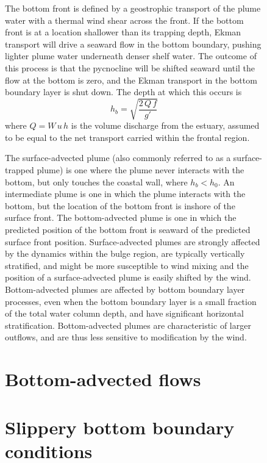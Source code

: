 \documentclass[11pt]{report}
\numberwithin{equation}{section}
\begin{document}
\begin{figure}
The bottom front is defined by a geostrophic transport of the plume water with a thermal wind shear across the front.  If the bottom front is at a location shallower than its trapping depth, Ekman transport will drive a seaward flow in the bottom boundary, pushing lighter plume water underneath denser shelf water.  The outcome of this process is that the pycnocline will be shifted seaward until the flow at the bottom is zero, and the Ekman transport in the bottom boundary layer is shut down.  The depth at which this occurs is
\begin{equation}
    h_b = \sqrt{ \frac{2\,Q\,f}{g'} }
\end{equation}
where $Q=W\,u\,h$ is the volume discharge from the estuary, assumed to be equal to the net transport carried within the frontal region.

The surface-advected plume (also commonly referred to as a surface-trapped plume) is one where the plume never interacts with the bottom, but only touches the coastal wall, where $h_b < h_0$.  An intermediate plume is one in which the plume interacts with the bottom, but the location of the bottom front is inshore of the surface front.  The bottom-advected plume is one in which the predicted position of the bottom front is seaward of the predicted surface front position.  Surface-advected plumes are strongly affected by the dynamics within the bulge region, are typically vertically stratified, and might be more susceptible to wind mixing and the position of a surface-advected plume is easily shifted by the wind.  Bottom-advected plumes are affected by bottom boundary layer processes, even when the bottom boundary layer is a small fraction of the total water column depth, and have significant horizontal stratification.  Bottom-advected plumes are characteristic of larger outflows, and are thus less sensitive to modification by the wind.


\section{Bottom-advected flows}

\section{Slippery bottom boundary conditions}




\end{figure}
\end{document}
